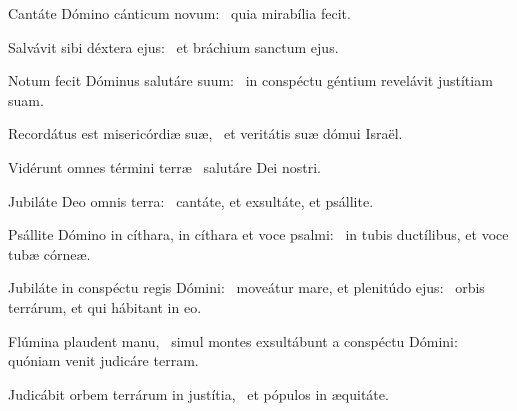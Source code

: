 \item Cantáte Dómino cánticum novum:~\psstar{} quia mirabília fecit.

\item Salvávit sibi déxtera ejus:~\psstar{} et bráchium sanctum ejus.

\item Notum fecit Dóminus salutáre suum:~\psstar{} in conspéctu géntium revelávit justítiam suam.

\item Recordátus est misericórdiæ suæ,~\psstar{} et veritátis suæ dómui Israël.

\item Vidérunt omnes términi terræ~\psstar{} salutáre Dei nostri.

\item Jubiláte Deo omnis terra:~\psstar{} cantáte, et exsultáte, et psállite.

\item Psállite Dómino in cíthara, in cíthara et voce psalmi:~\psstar{} in tubis ductílibus, et voce tubæ córneæ.

\item Jubiláte in conspéctu regis Dómini:~\pscross{} moveátur mare, et plenitúdo ejus:~\psstar{} orbis terrárum, et qui hábitant in eo.

\item Flúmina plaudent manu,~\pscross{} simul montes exsultábunt a conspéctu Dómini:~\psstar{} quóniam venit judicáre terram.

\item Judicábit orbem terrárum in justítia,~\psstar{} et pópulos in æquitáte.
